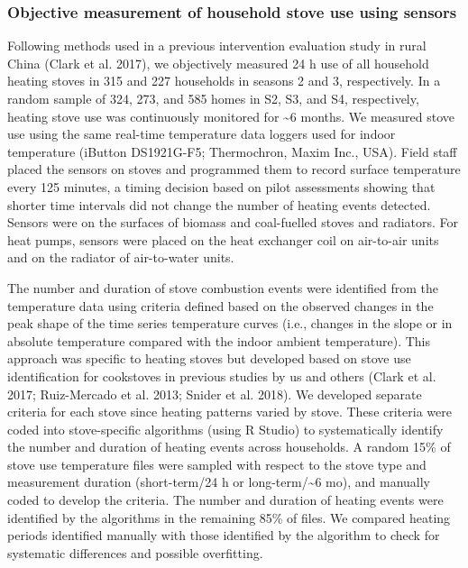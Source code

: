 \documentclass[
  letterpaper,
  DIV=11,
  numbers=noendperiod]{scrartcl}
\begin{document}
\hypertarget{objective-measurement-of-household-stove-use-using-sensors}{%
\subsubsection{Objective measurement of household stove use using
sensors}\label{objective-measurement-of-household-stove-use-using-sensors}}

Following methods used in a previous intervention evaluation study in
rural China (Clark et al. 2017), we objectively measured 24 h use of all
household heating stoves in 315 and 227 households in seasons 2 and 3,
respectively. In a random sample of 324, 273, and 585 homes in S2, S3,
and S4, respectively, heating stove use was continuously monitored for
\textasciitilde6 months. We measured stove use using the same real-time
temperature data loggers used for indoor temperature (iButton
DS1921G-F5; Thermochron, Maxim Inc., USA). Field staff placed the
sensors on stoves and programmed them to record surface temperature
every 125 minutes, a timing decision based on pilot assessments showing
that shorter time intervals did not change the number of heating events
detected. Sensors were on the surfaces of biomass and coal-fuelled
stoves and radiators. For heat pumps, sensors were placed on the heat
exchanger coil on air-to-air units and on the radiator of air-to-water
units.

The number and duration of stove combustion events were identified from
the temperature data using criteria defined based on the observed
changes in the peak shape of the time series temperature curves (i.e.,
changes in the slope or in absolute temperature compared with the indoor
ambient temperature). This approach was specific to heating stoves but
developed based on stove use identification for cookstoves in previous
studies by us and others (Clark et al. 2017; Ruiz-Mercado et al. 2013;
Snider et al. 2018). We developed separate criteria for each stove since
heating patterns varied by stove. These criteria were coded into
stove-specific algorithms (using R Studio) to systematically identify
the number and duration of heating events across households. A random
15\% of stove use temperature files were sampled with respect to the
stove type and measurement duration (short-term/24 h or
long-term/\textasciitilde6 mo), and manually coded to develop the
criteria. The number and duration of heating events were identified by
the algorithms in the remaining 85\% of files. We compared heating
periods identified manually with those identified by the algorithm to
check for systematic differences and possible overfitting.
\end{document}
